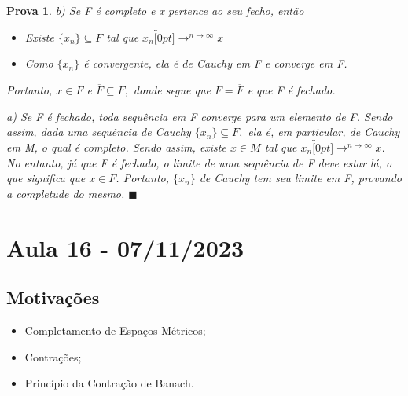 \documentclass{article}
\newtheorem*{proof*}{\underline{Prova}}
\renewcommand\qedsymbol{$\blacksquare$}
\begin{document}
\begin{proof*}
  b) Se F é completo e x pertence ao seu fecho, então 
 \begin{itemize}
   \item[i)] Existe \(\{x_{n}\}\subseteq{F}\) tal que \(x_{n}\overbracket[0pt]{\longrightarrow}^{n\to \infty}x\)
   \item[ii)] Como \(\{x_{n}\}\) é convergente, ela é de Cauchy em F e converge em F.
 \end{itemize}
 Portanto, \(x\in F\) e \(\overline{F}\subseteq{F},\) donde segue que \(F = \overline{F}\) e que F é fechado.

 a) Se F é fechado, toda sequência em F converge para um elemento de F. Sendo assim, dada uma sequência de Cauchy \(\{x_{n}\}\subseteq{F},\) ela é,
em particular, de Cauchy em M, o qual é completo. Sendo assim, existe \(x\in M\) tal que \(x_{n}\overbracket[0pt]{\longrightarrow}^{n\to \infty}x.\) No entanto,
já que F é fechado, o limite de uma sequência de F deve estar lá, o que significa que \(x\in F\). Portanto, \(\{x_{n}\}\) de Cauchy tem seu limite em F, provando a 
completude do mesmo. \qedsymbol
\end{proof*}
\newpage

\section{Aula 16 - 07/11/2023}
\subsection{Motivações}
\begin{itemize}
  \item Completamento de Espaços Métricos;
  \item Contrações;
  \item Princípio da Contração de Banach.
\end{itemize}
\end{document}
